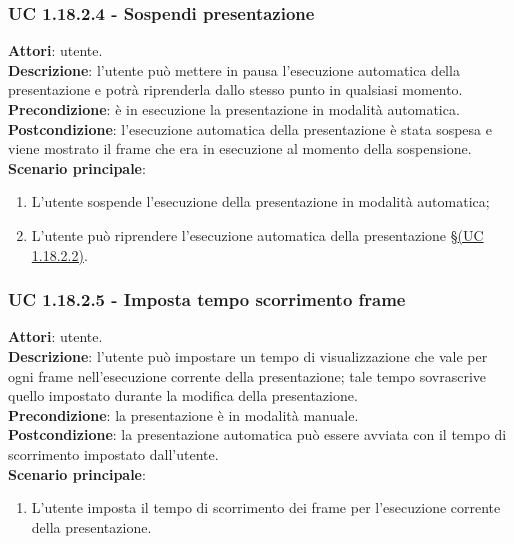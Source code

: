 	\subsubsection{UC 1.18.2.4 - Sospendi presentazione}{
		\label{uc1.18.2.4}
		\textbf{Attori}: utente. \\
		\textbf{Descrizione}: l'utente può mettere in pausa l'esecuzione automatica della presentazione e potrà riprenderla dallo stesso punto in qualsiasi momento. \\
		\textbf{Precondizione}: è in esecuzione la presentazione in modalità automatica.	\\
		\textbf{Postcondizione}: l'esecuzione automatica della presentazione è stata sospesa e viene mostrato il frame che era in esecuzione al momento della sospensione.\\
		\textbf{Scenario principale}:
		\begin{enumerate}
			\item L'utente sospende l'esecuzione della presentazione in modalità automatica;
			\item L'utente può riprendere l'esecuzione automatica della presentazione \S\hyperref[uc1.18.2.2]{(UC 1.18.2.2)}.
		\end{enumerate}		
	}
	\subsubsection{UC 1.18.2.5 - Imposta tempo scorrimento frame}{
		\label{uc1.18.2.5}
		\textbf{Attori}: utente. \\
		\textbf{Descrizione}: l'utente può impostare un tempo di visualizzazione che vale per ogni frame nell'esecuzione corrente della presentazione; tale tempo sovrascrive quello impostato durante la modifica della presentazione. \\
		\textbf{Precondizione}: la presentazione è in modalità manuale.	\\
		\textbf{Postcondizione}: la presentazione automatica può essere avviata con il tempo di scorrimento impostato dall'utente.\\
		\textbf{Scenario principale}:
		\begin{enumerate}
			\item L'utente imposta il tempo di scorrimento dei frame per l'esecuzione corrente della presentazione.
		\end{enumerate}		}
